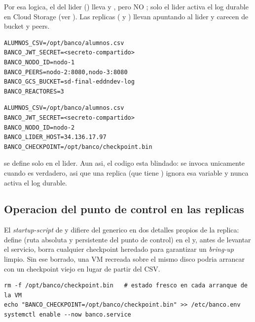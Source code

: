 Por esa logica, el  del lider () lleva
 y , pero NO ;
solo el lider activa el log durable en Cloud Storage (ver
). Las replicas ( y )
llevan  apuntando al lider y carecen de bucket y peers.

\begin{lstlisting}[language=none,caption={EnvironmentFile del lider nodo-1 (/etc/banco.env).}]
ALUMNOS_CSV=/opt/banco/alumnos.csv
BANCO_JWT_SECRET=<secreto-compartido>
BANCO_NODO_ID=nodo-1
BANCO_PEERS=nodo-2:8080,nodo-3:8080
BANCO_GCS_BUCKET=sd-final-eddndev-log
BANCO_REACTORES=3
\end{lstlisting}

\begin{lstlisting}[language=none,caption={EnvironmentFile de una replica nodo-2 (/etc/banco.env).}]
ALUMNOS_CSV=/opt/banco/alumnos.csv
BANCO_JWT_SECRET=<secreto-compartido>
BANCO_NODO_ID=nodo-2
BANCO_LIDER_HOST=34.136.17.97
BANCO_CHECKPOINT=/opt/banco/checkpoint.bin
\end{lstlisting}

\begin{advertencia}
 se define solo en el lider. Aun asi, el codigo esta
blindado:  se invoca unicamente cuando
 es verdadero, asi que una replica (que tiene
) ignora esa variable y nunca activa el log durable.
\end{advertencia}

\subsection{Operacion del punto de control en las replicas}

El \emph{startup-script} de  y  difiere del generico
en dos detalles propios de la replica: define  (ruta
absoluta y persistente del punto de control) en el  y, antes
de levantar el servicio, borra cualquier checkpoint heredado para garantizar un
\emph{bring-up} limpio. Sin ese borrado, una VM recreada sobre el mismo disco podria
arrancar con un checkpoint viejo en lugar de partir del CSV.

\begin{lstlisting}[language=none,caption={Variante del startup-script de una replica (bring-up limpio).}]
rm -f /opt/banco/checkpoint.bin   # estado fresco en cada arranque de la VM
echo "BANCO_CHECKPOINT=/opt/banco/checkpoint.bin" >> /etc/banco.env
systemctl enable --now banco.service
\end{lstlisting}


